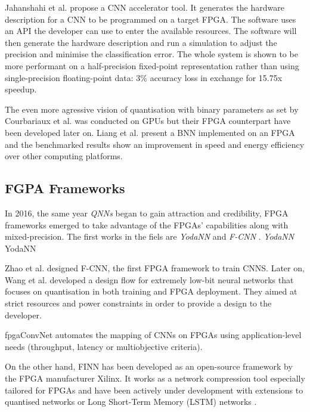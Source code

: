 Jahanshahi et al. \cite{Jahanshahi2019} propose a CNN accelerator tool. It generates the hardware description for a CNN to be programmed on a target FPGA. The software uses an API the developer can use to enter the available resources. The software will then generate the hardware description and run a simulation to adjust the precision and minimise the classification error. The whole system is shown to be more performant on a half-precision fixed-point representation rather than using single-precision floating-point data: 3\% accuracy loss in exchange for 15.75x speedup.

The even more agressive vision of quantisation with binary parameters as set by Courbariaux et al. \cite{Courbariaux2016} was conducted on GPUs but their FPGA counterpart have been developed later on. Liang et al. \cite{Liang2017} present a BNN implemented on an FPGA and the benchmarked results show an improvement in speed and energy efficiency over other computing platforms.



\subsection{FGPA Frameworks}

In 2016, the same year \emph{QNNs} began to gain attraction and credibility, FPGA frameworks emerged to take advantage of the FPGAs' capabilities along with mixed-precision. The first works in the fiels are \emph{YodaNN} \cite{Andri2016} and \emph{F-CNN} \cite{Zhao2016}. \emph{YodaNN}
YodaNN \cite{Andri2016}

Zhao et al. \cite{Zhao2016} designed F-CNN, the first FPGA framework to train CNNS. Later on, Wang et al. \cite{Wang2018} developed a design flow for extremely low-bit neural networks that focuses on quantisation in both training and FPGA deployment. They aimed at strict resources and power constraints in order to provide a design to the developer.

fpgaConvNet \cite{Venieris2017} automates the mapping of CNNs on FPGAs using application-level needs (throughput, latency or multiobjective criteria).

On the other hand, FINN \cite{Umuroglu2017} has been developed as an open-source framework by the FPGA manufacturer Xilinx. It works as a network compression tool especially tailored for FPGAs and have been actively under development with extensions to quantised networks \cite{Blott2018} or Long Short-Term Memory (LSTM) networks \cite{Rybalkin2018}.

